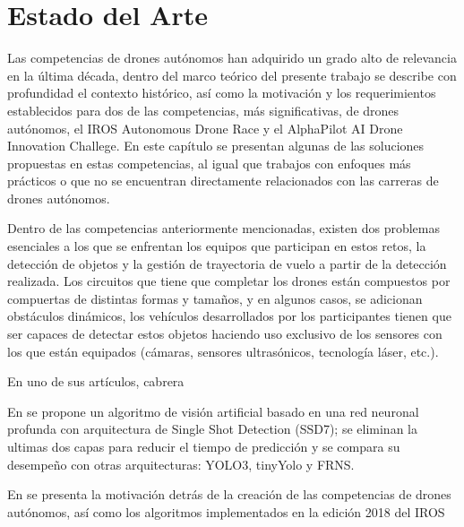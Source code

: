 \chapter{Estado del Arte}

Las competencias de drones autónomos han adquirido un grado alto de relevancia en la última década, dentro del marco teórico del presente trabajo se describe con profundidad el contexto histórico, así como la motivación y los requerimientos establecidos para dos de las competencias, más significativas, de drones autónomos, el  IROS Autonomous Drone Race y el AlphaPilot AI Drone Innovation Challege. 
En este capítulo se presentan algunas de las soluciones propuestas en estas competencias, al igual que trabajos con enfoques más prácticos o que no se encuentran directamente relacionados con las carreras de drones autónomos.

Dentro de las competencias anteriormente mencionadas, existen dos problemas esenciales a los que se enfrentan los equipos que participan en estos retos, la detección de objetos y la gestión de trayectoria de vuelo a partir de la detección realizada. 
Los circuitos que tiene que completar los drones están compuestos por compuertas de distintas formas y tamaños, y en algunos casos, se adicionan obstáculos dinámicos, los vehículos desarrollados por los participantes tienen que ser capaces de detectar estos objetos haciendo uso exclusivo de los sensores con los que están equipados (cámaras, sensores ultrasónicos, tecnología láser, etc.).

En uno de sus artículos, cabrera 

En \cite{cabrera2019gate} se propone un algoritmo de visión artificial basado en una red neuronal profunda con arquitectura de Single Shot Detection (SSD7); se eliminan la ultimas dos capas para reducir el tiempo de predicción y se compara su desempeño con otras arquitecturas: YOLO3, tinyYolo y FRNS.

En \cite{moon2019challenges} se presenta la motivación detrás de la creación de las competencias de drones autónomos, así como los algoritmos implementados en la edición 2018 del IROS 

